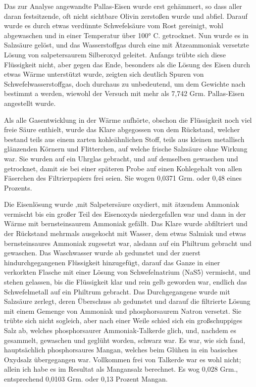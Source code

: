 \documentclass[a4paper, 11pt, oneside]{article}
\begin{document}
Das zur Analyse angewandte Pallas-Eisen wurde erst gehämmert, so dass aller daran festsitzende, oft nicht sichtbare Olivin zerstoßen wurde und abfiel. Darauf wurde es durch etwas verdünnte Schwefelsäure vom Rost gereinigt, wohl abgewaschen und in einer Temperatur über 100° C. getrocknet. Nun wurde es in Salzsäure gelöst, und das Wasserstoffgas durch eine mit Ätzeammoniak versetzte Lösung von salpetersaurem Silberoxyd geleitet. Anfangs trübte sich diese Flüssigkeit nicht, aber gegen das Ende, besonders als die Lösung des Eisen durch etwas Wärme unterstützt wurde, zeigten sich deutlich Spuren von Schwefelwasserstoffgas, doch durchaus zu unbedeutend, um dem Gewichte nach bestimmt a werden, wiewohl der Versuch mit mehr als 7,742 Grm. Pallas-Eisen angestellt wurde.

Als alle Gasentwicklung in der Wärme aufhörte, obschon die Flüssigkeit noch viel freie Säure enthielt, wurde das Klare abgegossen von dem Rückstand, welcher bestand teils aus einem zarten kohleähnlichen Stoff, teils aus kleinen metallisch glänzenden Körnern und Flitterchen, auf welche frische Salzsäure ohne Wirkung war. Sie wurden auf ein Uhrglas gebracht, und auf demselben gewaschen und getrocknet, damit sie bei einer späteren Probe auf einen Kohlegehalt von allen Fäserchen des Filtrierpapiers frei seien. Sie wogen 0,0371 Grm. oder 0,48 eines Prozents.

Die Eisenlösung wurde ‚mit Salpetersäure oxydiert, mit ätzendem Ammoniak vermischt bis ein großer Teil des Eisenoxyds niedergefallen war und dann in der Wärme mit bernsteinsaurem Ammoniak gefällt. Das Klare wurde abfiltriert und der Rückstand mehrmals ausgekocht mit Wasser, dem etwas Salmiak und etwas bernsteinsaures Ammoniak zugesetzt war, alsdann auf ein Philtrum gebracht und gewaschen. Das Waschwasser wurde ab gedunstet und der zuerst hindurchgegangenen Flüssigkeit hinzugefügt, darauf das Ganze in einer verkorkten Flasche mit einer Lösung von Schwefelnatrium (NaS5) vermischt, und stehen gelassen, bis die Flüssigkeit klar und rein gelb geworden war, endlich das Schwefelmetall auf ein Philtrum gebracht. Das Durchgegangene wurde mit Salzsäure zerlegt, deren Überschuss ab gedunstet und darauf die filtrierte Lösung mit einem Gemenge von Ammoniak und phosphorsaurem Natron versetzt. Sie trübte sich nicht sogleich, aber nach einer Weile schied sich ein großschuppiges Salz ab, welches phosphorsaurer Ammoniak-Talkerde glich, und, nachdem es gesammelt, gewaschen und geglüht worden, schwarz war. Es war, wie sich fand, hauptsächlich phosphorsaures Mangan, welches beim Glühen in ein basisches Oxydsalz übergegangen war. Vollkommen frei von Talkerde war es wohl nicht; allein ich habe es im Resultat als Mangansalz berechnet. Es wog 0,028 Grm., entsprechend 0,0103 Grm. oder 0,13 Prozent Mangan.
\end{document}
